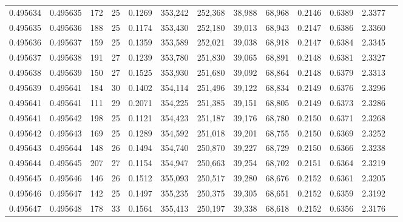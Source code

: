 \begin{tabular}{rrrrrrrrrrrrr}
0.495634 & 0.495635 & 172 &  25 &                                     0.1269 & 353,242 & 252,368 &  38,988 &  68,968 & 0.2146 & 0.6389 & 2.3377 \\
0.495635 & 0.495636 & 188 &  25 &                                     0.1174 & 353,430 & 252,180 &  39,013 &  68,943 & 0.2147 & 0.6386 & 2.3360 \\
0.495636 & 0.495637 & 159 &  25 &                                     0.1359 & 353,589 & 252,021 &  39,038 &  68,918 & 0.2147 & 0.6384 & 2.3345 \\
0.495637 & 0.495638 & 191 &  27 &                                     0.1239 & 353,780 & 251,830 &  39,065 &  68,891 & 0.2148 & 0.6381 & 2.3327 \\
0.495638 & 0.495639 & 150 &  27 &                                     0.1525 & 353,930 & 251,680 &  39,092 &  68,864 & 0.2148 & 0.6379 & 2.3313 \\
0.495639 & 0.495641 & 184 &  30 &                                     0.1402 & 354,114 & 251,496 &  39,122 &  68,834 & 0.2149 & 0.6376 & 2.3296 \\
0.495641 & 0.495641 & 111 &  29 &                                     0.2071 & 354,225 & 251,385 &  39,151 &  68,805 & 0.2149 & 0.6373 & 2.3286 \\
0.495641 & 0.495642 & 198 &  25 &                                     0.1121 & 354,423 & 251,187 &  39,176 &  68,780 & 0.2150 & 0.6371 & 2.3268 \\
0.495642 & 0.495643 & 169 &  25 &                                     0.1289 & 354,592 & 251,018 &  39,201 &  68,755 & 0.2150 & 0.6369 & 2.3252 \\
0.495643 & 0.495644 & 148 &  26 &                                     0.1494 & 354,740 & 250,870 &  39,227 &  68,729 & 0.2150 & 0.6366 & 2.3238 \\
0.495644 & 0.495645 & 207 &  27 &                                     0.1154 & 354,947 & 250,663 &  39,254 &  68,702 & 0.2151 & 0.6364 & 2.3219 \\
0.495645 & 0.495646 & 146 &  26 &                                     0.1512 & 355,093 & 250,517 &  39,280 &  68,676 & 0.2152 & 0.6361 & 2.3205 \\
0.495646 & 0.495647 & 142 &  25 &                                     0.1497 & 355,235 & 250,375 &  39,305 &  68,651 & 0.2152 & 0.6359 & 2.3192 \\
0.495647 & 0.495648 & 178 &  33 &                                     0.1564 & 355,413 & 250,197 &  39,338 &  68,618 & 0.2152 & 0.6356 & 2.3176 \\

\end{tabular}
